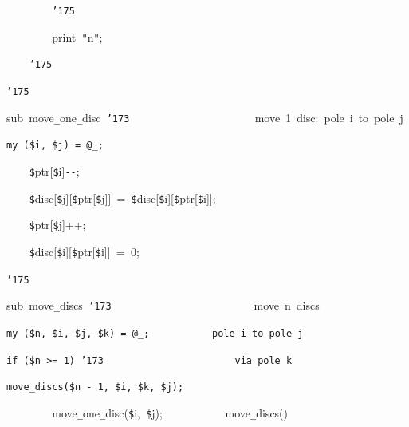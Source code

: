 \documentclass{article}
\begin{document}
\noindent
\mbox{}{\tt\mc \ \ \ \ \ \ \ \ }{\tt\char'175}

\noindent
\mbox{}{\tt\mc \ \ \ \ \ \ \ \ }print{\tt\mc \ }{\tt "}{\tt{}}n{\tt "};

\noindent
\mbox{}{\tt\mc \ \ \ \ }{\tt\char'175}

\noindent
\mbox{}{\tt\char'175}

\noindent
\mbox{}\hfill

\noindent
\mbox{}sub{\tt\mc \ }move{\tt\_}one{\tt\_}disc{\tt\mc \ }{\tt\char'173}{\tt\mc \ \ \ \ \ \ \ \ \ \ \ \ \ \ \ \ \ \ \ \ \ }\rm\mc {\tt\#}\ move\ 1\ disc:\ pole\ i\ to\ pole\ j

\noindent
\mbox{}\tt\mc {\tt\mc \ \ \ \ }my{\tt\mc \ }({\tt\$}i,{\tt\mc \ }{\tt\$}j){\tt\mc \ }={\tt\mc \ }@{\tt\_};

\noindent
\mbox{}{\tt\mc \ \ \ \ }{\tt\$}ptr[{\tt\$}i]{\tt -}{\tt -};

\noindent
\mbox{}{\tt\mc \ \ \ \ }{\tt\$}disc[{\tt\$}j][{\tt\$}ptr[{\tt\$}j]]{\tt\mc \ }={\tt\mc \ }{\tt\$}disc[{\tt\$}i][{\tt\$}ptr[{\tt\$}i]];

\noindent
\mbox{}{\tt\mc \ \ \ \ }{\tt\$}ptr[{\tt\$}j]++;

\noindent
\mbox{}{\tt\mc \ \ \ \ }{\tt\$}disc[{\tt\$}i][{\tt\$}ptr[{\tt\$}i]]{\tt\mc \ }={\tt\mc \ }0;

\noindent
\mbox{}{\tt\char'175}

\noindent
\mbox{}\hfill

\noindent
\mbox{}sub{\tt\mc \ }move{\tt\_}discs{\tt\mc \ }{\tt\char'173}{\tt\mc \ \ \ \ \ \ \ \ \ \ \ \ \ \ \ \ \ \ \ \ \ \ \ \ }\rm\mc {\tt\#}\ move\ n\ discs

\noindent
\mbox{}\tt\mc {\tt\mc \ \ \ \ }my{\tt\mc \ }({\tt\$}n,{\tt\mc \ }{\tt\$}i,{\tt\mc \ }{\tt\$}j,{\tt\mc \ }{\tt\$}k){\tt\mc \ }={\tt\mc \ }@{\tt\_};{\tt\mc \ \ \ \ \ \ \ \ \ \ }\rm\mc {\tt\#}\ pole\ i\ to\ pole\ j

\noindent
\mbox{}\tt\mc {\tt\mc \ \ \ \ }if{\tt\mc \ }({\tt\$}n{\tt\mc \ }{\tt >}={\tt\mc \ }1){\tt\mc \ }{\tt\char'173}{\tt\mc \ \ \ \ \ \ \ \ \ \ \ \ \ \ \ \ \ \ \ \ \ \ }\rm\mc {\tt\#}\ via\ pole\ k

\noindent
\mbox{}\tt\mc {\tt\mc \ \ \ \ \ \ \ \ }move{\tt\_}discs({\tt\$}n{\tt\mc \ }{\tt -}{\tt\mc \ }1,{\tt\mc \ }{\tt\$}i,{\tt\mc \ }{\tt\$}k,{\tt\mc \ }{\tt\$}j);

\noindent
\mbox{}{\tt\mc \ \ \ \ \ \ \ \ }move{\tt\_}one{\tt\_}disc({\tt\$}i,{\tt\mc \ }{\tt\$}j);{\tt\mc \ \ \ \ \ \ \ \ \ \ }\rm\mc {\tt\#}\ move{\tt\_}discs()
\end{document}
